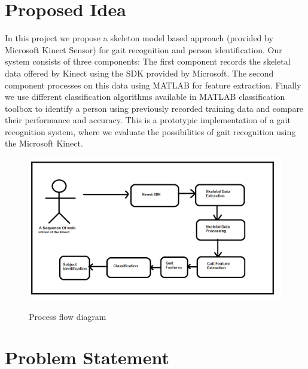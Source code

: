 \section{Proposed Idea} \label{Proposed Idea}
\noindent In this project we propose a skeleton model based approach (provided by Microsoft Kinect Sensor) for gait recognition and person identification. Our system consists of three components: The first component records the skeletal data offered by Kinect using the SDK provided by Microsoft. The second component processes on this data using MATLAB for feature extraction. Finally we use different classification algorithms available in MATLAB classification toolbox to identify a person using previously recorded training data and compare their performance and accuracy. This is a prototypic implementation of a gait recognition system, where we evaluate the possibilities of gait recognition using the Microsoft Kinect.


\begin{figure}[h]
\centering 
{\includegraphics[scale=0.55]{Figprocessflow.png}}
\caption{Process flow diagram}
\end{figure}

\section{Problem Statement} \label{Problem Statement}